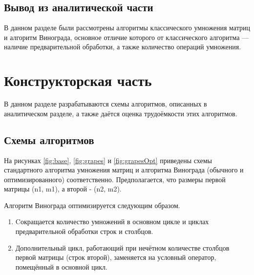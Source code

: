 \documentclass[12pt]{report}
\begin{document}
\section{Вывод из аналитической части}
	В данном разделе были рассмотрены алгоритмы классического умножения матриц и алгоритм Винограда, основное отличие которого от классического алгоритма — наличие предварительной обработки, а также количество операций умножения. 
\clearpage

\chapter{Конструкторская часть}

В данном разделе разрабатываются схемы алгоритмов, описанных в аналитическом разделе, а также даётся оценка трудоёмкости этих алгоритмов.
\section{Схемы алгоритмов}

На рисунках  \ref{fig:base}, \ref{fig:grapes} и \ref{fig:grapesOpt} приведены схемы стандартного алгоритма умножения матриц и алгоритма Винограда (обычного и оптимизированного) соответственно. Предполагается, что размеры первой матрицы (n1, m1), а второй - (n2, m2).

Алгоритм Винограда оптимизируется следующим образом.
\begin{enumerate}
\item Cокращается количество умножений в основном цикле и циклах предварительной обработки строк и столбцов.
\item Дополнительный цикл, работающий при нечётном количестве столбцов первой матрицы (строк второй), заменяется на условный оператор, помещённый в основной цикл.
\end{enumerate}
\end{document}
